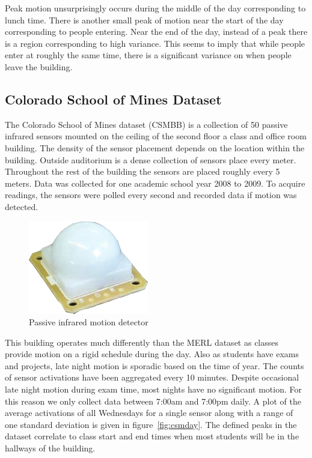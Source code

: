 \documentclass{acm_proc_article-sp}
\begin{document}
Peak motion unsurprisingly occurs during the middle of the day corresponding to lunch time.  There is another small peak of motion near the start of the day corresponding to people entering.  Near the end of the day, instead of a peak there is a region corresponding to high variance.  This seems to imply that while people enter at roughly the same time, there is a significant variance on when people leave the building.

\subsection{Colorado School of Mines Dataset}

The Colorado School of Mines dataset (CSMBB) is a collection of 50 passive infrared sensors mounted on the ceiling of the second floor a class and office room building.  The density of the sensor placement depends on the location within the building.  Outside auditorium is a dense collection of sensors place every meter.  Throughout the rest of the building the sensors are placed roughly every 5 meters.  Data was collected for one academic school year 2008 to 2009.  To acquire readings, the sensors were polled every second and recorded data if motion was detected.  

\begin{figure}[h]
\centering
\includegraphics[width = .4\linewidth]{pir_sensor.png}
\caption{Passive infrared motion detector}
\end{figure}

This building operates much differently than the MERL dataset as classes provide motion on a rigid schedule during the day.  Also as students have exams and projects, late night motion is sporadic based on the time of year.    The counts of sensor activations have been aggregated every 10 minutes.  Despite occasional late night motion during exam time, most nights have no significant motion.  For this reason we only collect data between 7:00am and 7:00pm daily.  A plot of the average activations of all Wednesdays for a single sensor along with a range of one standard deviation is given in figure~\ref{fig:csmday}.  The defined peaks in the dataset correlate to class start and end times when most students will be in the hallways of the building.
\end{document}

